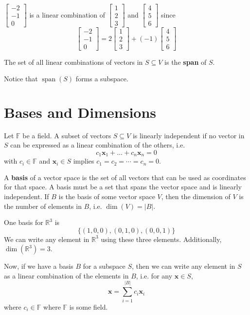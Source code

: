 \documentclass[12pt]{article}
\begin{document}
\begin{example}
$\begin{bmatrix}-2 \\ -1 \\ 0\end{bmatrix}$ is a linear combination of $\begin{bmatrix}1 \\ 2 \\ 3\end{bmatrix}$ and $\begin{bmatrix}4 \\ 5 \\ 6\end{bmatrix}$ since $$\begin{bmatrix}-2 \\ -1 \\ 0\end{bmatrix} = 2\begin{bmatrix}1 \\ 2 \\ 3\end{bmatrix} + (-1)\begin{bmatrix}4 \\ 5 \\ 6\end{bmatrix}$$
\end{example}
\begin{definition}
The set of all linear combinations of vectors in $S\subseteq V$ is the \textbf{span} of $S$.
\end{definition}
\noindent Notice that $\operatorname{span}(S)$ forms a subspace. 

\section{Bases and Dimensions}
\begin{definition}
Let $\mathbb{F}$ be a field. A subset of vectors $S\subseteq V$ is linearly independent if no vector in $S$ can be expressed as a linear combination of the others, i.e. $$c_1\mathbf{x}_1 + \ldots + c_n\mathbf{x}_n = 0$$ with $c_i\in\mathbb{F}$ and $\mathbf{x}_i\in S$ implies $c_1=c_2=\cdots = c_n=0$.
\end{definition}
\noindent A \textbf{basis} of a vector space is the set of all vectors that can be used as coordinates for that space. A basis must be a set that spans the vector space and is linearly independent. 
\noindent If $B$ is the basis of some vector space $V$, then the dimension of $V$ is the number of elements in $B$, i.e. $\dim(V) = |B|$.
\begin{example}
One basis for $\mathbb{R}^3$ is $$\{(1,0,0),(0,1,0),(0,0,1)\}$$ We can write any element in $\mathbb{R}^3$ using these three elements. Additionally, $\dim(\mathbb{R}^3) = 3$.
\end{example}
\noindent Now, if we have a basis $B$ for a subspace $S$, then we can write any element in $S$ as a linear combination of the elements in $B$, i.e. for any $\mathbf{x}\in S$, $$\mathbf{x}=\sum_{i=1}^{|B|} c_i\mathbf{x}_i$$ where $c_i\in\mathbb{F}$ where $\mathbb{F}$ is some field.
\end{document}
